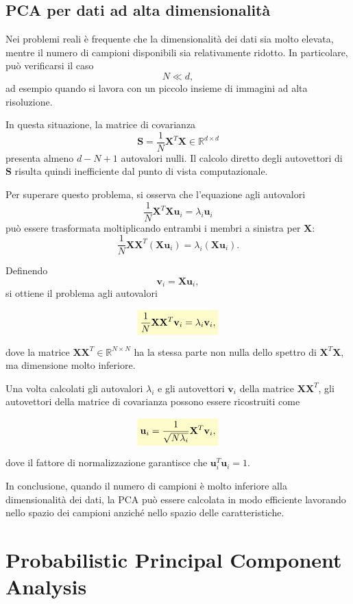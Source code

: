 \documentclass[a4paper,12pt]{report}
\newcommand{\highlight}[1]{%
\colorbox{yellow!20}{$\displaystyle #1$}%
}
\begin{document}
\subsection{PCA per dati ad alta dimensionalità}

Nei problemi reali è frequente che la dimensionalità dei dati sia molto elevata, mentre il numero di campioni disponibili sia relativamente ridotto. In particolare, può verificarsi il caso
\[
N \ll d,
\]
ad esempio quando si lavora con un piccolo insieme di immagini ad alta risoluzione.

In questa situazione, la matrice di covarianza
\[
\mathbf{S} = \frac{1}{N} \mathbf{X}^T \mathbf{X} \in \mathbb{R}^{d \times d}
\]
presenta almeno $d - N + 1$ autovalori nulli. 
Il calcolo diretto degli autovettori di $\mathbf{S}$ risulta quindi inefficiente dal punto di vista computazionale.

Per superare questo problema, si osserva che l'equazione agli autovalori
\[
\frac{1}{N} \mathbf{X}^T \mathbf{X} \mathbf{u}_i = \lambda_i \mathbf{u}_i
\]
può essere trasformata moltiplicando entrambi i membri a sinistra per $\mathbf{X}$:
\[
\frac{1}{N} \mathbf{X} \mathbf{X}^T (\mathbf{X} \mathbf{u}_i) = \lambda_i (\mathbf{X} \mathbf{u}_i).
\]

Definendo
\[
\mathbf{v}_i = \mathbf{X} \mathbf{u}_i,
\]
si ottiene il problema agli autovalori

\[
\highlight{
\frac{1}{N} \mathbf{X} \mathbf{X}^T \mathbf{v}_i = \lambda_i \mathbf{v}_i,}
\]

dove la matrice $\mathbf{X} \mathbf{X}^T \in \mathbb{R}^{N \times N}$ ha la stessa parte non nulla dello spettro di $\mathbf{X}^T \mathbf{X}$, ma dimensione molto inferiore.

Una volta calcolati gli autovalori $\lambda_i$ e gli autovettori $\mathbf{v}_i$ della matrice $\mathbf{X} \mathbf{X}^T$, gli autovettori della matrice di covarianza possono essere ricostruiti come

\[
\highlight{
\mathbf{u}_i = \frac{1}{\sqrt{N \lambda_i}} \mathbf{X}^T \mathbf{v}_i,}
\]

dove il fattore di normalizzazione garantisce che $\mathbf{u}_i^T \mathbf{u}_i = 1$.

In conclusione, quando il numero di campioni è molto inferiore alla dimensionalità dei dati, 
la PCA può essere calcolata in modo efficiente lavorando nello spazio dei campioni anziché nello spazio delle caratteristiche.

\section{Probabilistic Principal Component Analysis}
\end{document}
